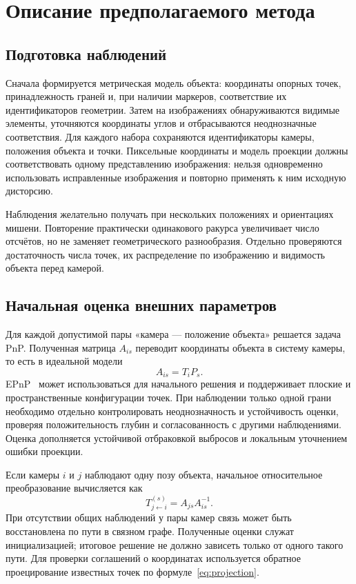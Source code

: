\section{Описание предполагаемого метода}

\subsection{Подготовка наблюдений}

Сначала формируется метрическая модель объекта: координаты опорных точек, принадлежность граней и, при наличии маркеров, соответствие их идентификаторов геометрии. Затем на изображениях обнаруживаются видимые элементы, уточняются координаты углов и отбрасываются неоднозначные соответствия. Для каждого набора сохраняются идентификаторы камеры, положения объекта и точки. Пиксельные координаты и модель проекции должны соответствовать одному представлению изображения: нельзя одновременно использовать исправленные изображения и повторно применять к ним исходную дисторсию.

Наблюдения желательно получать при нескольких положениях и ориентациях мишени. Повторение практически одинакового ракурса увеличивает число отсчётов, но не заменяет геометрического разнообразия. Отдельно проверяются достаточность числа точек, их распределение по изображению и видимость объекта перед камерой.

\subsection{Начальная оценка внешних параметров}

Для каждой допустимой пары «камера --- положение объекта» решается задача PnP. Полученная матрица $A_{is}$ переводит координаты объекта в систему камеры, то есть в идеальной модели
\begin{equation}
  A_{is}=T_iP_s.
\end{equation}
EPnP~\cite{lepetit2009} может использоваться для начального решения и поддерживает плоские и пространственные конфигурации точек. При наблюдении только одной грани необходимо отдельно контролировать неоднозначность и устойчивость оценки, проверяя положительность глубин и согласованность с другими наблюдениями. Оценка дополняется устойчивой отбраковкой выбросов и локальным уточнением ошибки проекции.

Если камеры $i$ и $j$ наблюдают одну позу объекта, начальное относительное преобразование вычисляется как
\begin{equation}
  T_{j\leftarrow i}^{(s)}=A_{js}A_{is}^{-1}.
  \label{eq:initial}
\end{equation}
При отсутствии общих наблюдений у пары камер связь может быть восстановлена по пути в связном графе. Полученные оценки служат инициализацией; итоговое решение не должно зависеть только от одного такого пути. Для проверки соглашений о координатах используется обратное проецирование известных точек по формуле~\eqref{eq:projection}.


